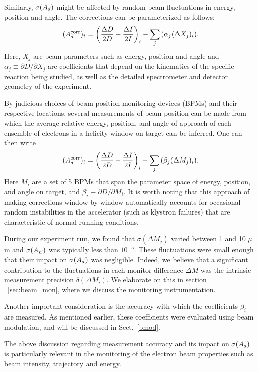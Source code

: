 Similarly, $\sigma(A_d)$ might be affected by random beam
fluctuations in energy, position and angle. The corrections can be
parameterized as follows:
\begin{equation}
(A^{\rm corr}_d)_i = \left(\frac{\Delta D}{2D} - \frac{\Delta I}{2I}\right)_i
-\sum_j{\left( {\alpha_j(\Delta X_j)_i}\right)}.
\end{equation}
Here, $X_j$ are beam parameters such as energy, position and
angle and $\alpha_j \equiv \partial D/\partial X_j$ are
coefficients that depend on the kinematics of the specific
reaction being studied, as well as the detailed spectrometer and
detector geometry of the experiment.

By judicious choices of beam position monitoring devices (BPMs)
and their respective locations, several measurements of beam
position can be made from which the average relative energy,
position, and angle of approach of each ensemble of electrons in a
helicity window on target can be inferred. One can then write
\begin{equation} 
(A^{\rm corr}_d)_i = \left(\frac{\Delta D}{2D} - \frac{\Delta I}{2I}\right)_i
-\sum_j{\left({\beta_j(\Delta M_j)_i}\right)}.
\end{equation}
Here $M_i$ are a set of 5 BPMs that span the parameter space of
energy, position, and angle on target, and $\beta_i \equiv \partial
D/\partial M_i$. It is worth noting that this approach of making
corrections window by window automatically accounts for occasional
random instabilities in the accelerator (such as klystron
failures) that are characteristic of normal running conditions.

During our experiment run, we found that $\sigma(\Delta M_j)$ varied
between 1 and 10 $\mu$m and $\sigma (A_E)$ was typically less
than $10^{-5}$. These fluctuations were small enough that their
impact on $\sigma (A_d)$ was negligible. Indeed, we believe that a
significant contribution to the fluctuations in each monitor
difference $\Delta M$ was the intrinsic measurement precision
$\delta(\Delta M_i)$. We elaborate on this in section
~\ref{sec:beam_mon},
where we discuss the monitoring instrumentation.

Another important consideration is the accuracy with which the
coefficients $\beta_i$ are measured. As mentioned earlier, these
coefficients were evaluated using beam modulation, and will be
discussed in Sect.~\ref{bmod}.

The above discussion regarding measurement accuracy and its impact
on $\sigma(A_d)$ is particularly relevant in the monitoring of the
electron beam properties such as beam intensity, trajectory and
energy.
